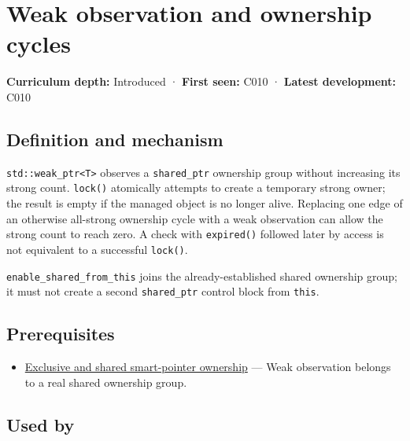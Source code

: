 \hypertarget{appendix-b9548675eb2b}{}\label{referencestart:appendix-b9548675eb2b}
\section{Weak observation and ownership cycles}\label{appendix-b9548675eb2b-weak-observation-and-ownership-cycles}

\textbf{Curriculum depth:} Introduced · \textbf{First seen:} C010 · \textbf{Latest development:} C010

\begin{allmightroledefinition}

\subsection{Definition and mechanism}\label{appendix-b9548675eb2b-definition-and-mechanism}

\texttt{std::weak\_ptr\textless{}T\textgreater{}} observes a \texttt{shared\_ptr} ownership group without increasing its strong count. \texttt{lock()} atomically attempts to create a temporary strong owner; the result is empty if the managed object is no longer alive. Replacing one edge of an otherwise all-strong ownership cycle with a weak observation can allow the strong count to reach zero. A check with \texttt{expired()} followed later by access is not equivalent to a successful \texttt{lock()}.

\end{allmightroledefinition}

\texttt{enable\_shared\_from\_this} joins the already-established shared ownership group; it must not create a second \texttt{shared\_ptr} control block from \texttt{this}.

\subsection{Prerequisites}\label{appendix-b9548675eb2b-prerequisites}

\begin{itemize}
\tightlist
\item
  \hyperref[appendix-51602cabe815]{Exclusive and shared smart-pointer ownership} --- Weak observation belongs to a real shared ownership group.
\end{itemize}

\subsection{Used by}\label{appendix-b9548675eb2b-used-by}

